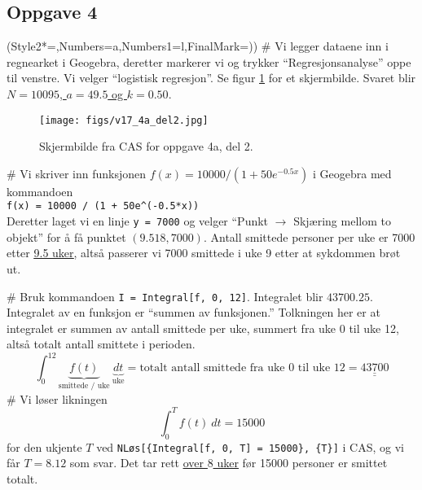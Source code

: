 \documentclass[12pt, a4paper]
{article}						%
\def\answer#1{\underline{\underline{#1}}}
\begin{document}
\subsection*{Oppgave 4}
\begin{easylist}[enumerate]
	\ListProperties(Style2*=,Numbers=a,Numbers1=l,FinalMark={)})
	# Vi legger dataene inn i regnearket i Geogebra, deretter markerer vi og trykker  ``Regresjonsanalyse'' oppe til venstre. Vi velger 
	``logistisk regresjon''. Se figur \ref{fig:cas4} for et skjermbilde.
	Svaret blir \answer{$N = 10095$, $a = 49.5$ og $k = 0.50$}.
	\begin{figure}[th!]
		\centering
		\texttt{[image: figs/v17\_4a\_del2.jpg]}
		\caption{Skjermbilde fra CAS for oppgave 4a, del 2.}
		\label{fig:cas4}
	\end{figure} 

	# Vi skriver inn funksjonen $f(x) = 10000 / (1 + 50 e^{-0.5x})$ i Geogebra med kommandoen \\
	\verb|f(x) = 10000 / (1 + 50e^(-0.5*x))| \\
	Deretter laget vi en linje \verb|y = 7000| og velger ``Punkt $\to$ Skjæring mellom to objekt''
	for å få punktet $(9.518, 7000)$. Antall smittede personer per uke er 7000 etter \answer{9.5 uker}, altså passerer vi 7000 smittede i uke 9 etter at sykdommen brøt ut.
	 
	# Bruk kommandoen \verb|I = Integral[f, 0, 12]|. Integralet blir $43700.25$.
	Integralet av en funksjon er ``summen av funksjonen.'' Tolkningen her er at
	integralet er summen av antall smittede per uke, summert fra uke 0 til uke 12, altså totalt antall smittete i perioden.
	\begin{equation*}
		\int_{0}^{12} \underset{\text{smittede / uke}}{\underbrace{f(t)}} \ \underset{\text{uke}}{\underbrace{dt}} = \text{totalt antall smittede fra uke 0 til uke 12} = \answer{43700}
	\end{equation*}
	# Vi løser likningen
	\begin{equation*}
		\int_{0}^{T} f(t) \ dt = 15 000
	\end{equation*}
	for den ukjente $T$ ved \verb|NLøs[{Integral[f, 0, T] = 15000}, {T}]|
	i CAS, og vi får $T = 8.12$ som svar. Det tar rett \answer{over $8$ uker} før 15000 personer
	er smittet totalt.
\end{easylist}
	
	
\end{document}
